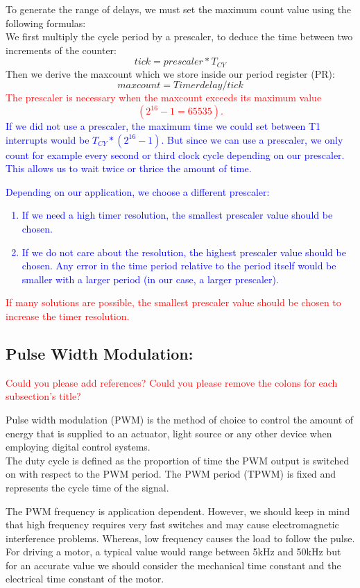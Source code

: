 To generate the range of delays, we must set the maximum count value using the following formulas:\\
We first multiply the cycle period by a prescaler, to deduce the time between two increments of the counter:
$$tick=prescaler*T_{CY}$$
Then we derive the maxcount which we store inside our period register (PR):
$$maxcount=Timer delay/tick$$
\textcolor{red}{The prescaler is necessary when the maxcount exceeds its maximum value $$(2^{16}-1=65535).$$ }
\textcolor{blue}{If we did not use a prescaler, the maximum time we could set between T1 interrupts would be $T_{CY}*(2^{16}-1)$. But since we can use a prescaler, we only count for example every second or third clock cycle depending on our prescaler. This allows us to wait twice or thrice the amount of time.}


\textcolor{blue}{Depending on our application, we choose a different prescaler:
\begin{enumerate}
    \item If we need a high timer resolution, the smallest prescaler value should be chosen. 
    \item If we do not care about the resolution, the highest prescaler value should be chosen. Any error in the time period relative to the period itself would be smaller with a larger period (in our case, a larger prescaler).
\end{enumerate}
}
\textcolor{red}{If many solutions are possible, the smallest prescaler value should be chosen to increase the timer resolution.}


\subsection{Pulse Width Modulation:} 

\textcolor{red}{Could you please add references?}
\textcolor{red}{Could you please remove the colons for each subsection's title?}

Pulse width modulation (PWM) is the method of choice to control the amount of energy that is supplied to an actuator, light source or any other device when employing digital control systems.\\
The duty cycle is defined as the proportion of time the PWM output is switched on with respect to the PWM period.
The PWM period (TPWM) is fixed and represents the cycle time of the signal.

The PWM frequency is application dependent. However, we should keep in mind that high frequency requires very fast switches and may cause electromagnetic interference problems. Whereas, low frequency causes the load to follow the pulse.\\
For driving a motor, a typical value would range between 5kHz and 50kHz but for an accurate value we should consider the mechanical time constant and the electrical time constant of the motor.

